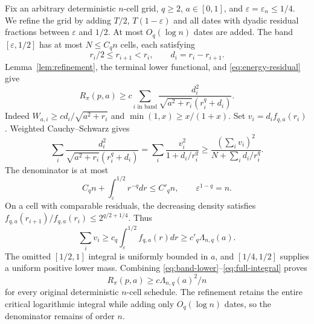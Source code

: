 \documentclass[11pt,a4paper]{amsart}
\theoremstyle{plain}
\theoremstyle{definition}
\theoremstyle{remark}
\newcommand{\eps}{\varepsilon}
\begin{document}
Fix an arbitrary deterministic $n$-cell grid, $q\ge2$, $a\in[0,1]$, and $\eps=\eps_n\le1/4$. We refine the grid by adding $T/2$, $T(1-\eps)$ and all dates with dyadic residual fractions between $\eps$ and $1/2$. At most $O_q(\log n)$ dates are added. The band $[\eps,1/2]$ has at most $N\le C_q n$ cells, each satisfying
\begin{equation}\label{eq:band-ratios}
 r_i/2\le r_{i+1}<r_i,\qquad d_i=r_i-r_{i+1}.
\end{equation}
Lemma~\ref{lem:refinement}, the terminal lower functional, and \eqref{eq:energy-residual} give
\begin{equation}\label{eq:band-lower}
 R_\pi(p,a)\ge c\sum_{i\text{ in band}}
 \frac{d_i^2}{\sqrt{a^2+r_i}(r_i^q+d_i)}.
\end{equation}
Indeed $W_{a,i}\ge c d_i/\sqrt{a^2+r_i}$ and $\min(1,x)\ge x/(1+x)$. Set $v_i=d_if_{q,a}(r_i)$. Weighted Cauchy--Schwarz gives
\begin{equation}\label{eq:budget-cs}
 \sum_i\frac{d_i^2}{\sqrt{a^2+r_i}(r_i^q+d_i)}
 =\sum_i\frac{v_i^2}{1+d_i/r_i^q}
 \ge\frac{(\sum_i v_i)^2}{N+\sum_i d_i/r_i^q}.
\end{equation}
The denominator is at most
\begin{equation}\label{eq:budget-denominator}
 C_q n+\int_\eps^{1/2}r^{-q}dr\le C'_q n,
 \qquad \eps^{1-q}=n.
\end{equation}
On a cell with comparable residuals, the decreasing density satisfies
$f_{q,a}(r_{i+1})/f_{q,a}(r_i)\le2^{q/2+1/4}$. Thus
\begin{equation}\label{eq:full-integral}
 \sum_i v_i\ge c_q\int_\eps^{1/2}f_{q,a}(r)dr
 \ge c'_q\Lambda_{n,q}(a).
\end{equation}
The omitted $[1/2,1]$ integral is uniformly bounded in $a$, and $[1/4,1/2]$ supplies a uniform positive lower mass. Combining \eqref{eq:band-lower}--\eqref{eq:full-integral} proves
\begin{equation}\label{eq:all-date-lower}
 R_\pi(p,a)\ge c\Lambda_{n,q}(a)^2/n
\end{equation}
for every original deterministic $n$-cell schedule. The refinement retains the entire critical logarithmic integral while adding only $O_q(\log n)$ dates, so the denominator remains of order $n$.
\end{document}
